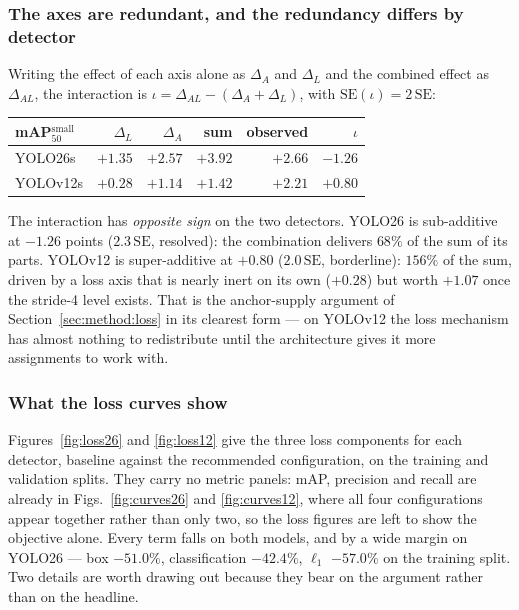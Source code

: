 \documentclass[10pt,twocolumn,a4paper]{article}
\begin{document}
\subsubsection*{The axes are redundant, and the redundancy differs by detector}

Writing the effect of each axis alone as $\Delta_A$ and $\Delta_L$ and the
combined effect as $\Delta_{AL}$, the interaction is
$\iota = \Delta_{AL} - (\Delta_A + \Delta_L)$, with
$\mathrm{SE}(\iota) = 2\,\mathrm{SE}$:

\begin{center}\small
\begin{tabular}{@{}lrrrrr@{}}
\toprule
mAP$_{50}^{\text{small}}$ & $\Delta_L$ & $\Delta_A$ & sum & observed & $\iota$ \\
\midrule
YOLO26s  & $+1.35$ & $+2.57$ & $+3.92$ & $+2.66$ & $\mathbf{-1.26}$ \\
YOLOv12s & $+0.28$ & $+1.14$ & $+1.42$ & $+2.21$ & $\mathbf{+0.80}$ \\
\bottomrule
\end{tabular}
\end{center}

\noindent The interaction has \emph{opposite sign} on the two detectors. YOLO26
is sub-additive at $-1.26$ points ($2.3\,\mathrm{SE}$, resolved): the
combination delivers $68\%$ of the sum of its parts. YOLOv12 is super-additive
at $+0.80$ ($2.0\,\mathrm{SE}$, borderline): $156\%$ of the sum, driven by a
loss axis that is nearly inert on its own ($+0.28$) but worth $+1.07$ once the
stride-4 level exists. That is the anchor-supply argument of
Section~\ref{sec:method:loss} in its clearest form --- on YOLOv12 the loss
mechanism has almost nothing to redistribute until the architecture gives it
more assignments to work with.



\subsubsection*{What the loss curves show}

Figures~\ref{fig:loss26} and \ref{fig:loss12} give the three loss components for
each detector, baseline against the recommended configuration, on the training
and validation splits. They carry no metric panels: mAP, precision and recall
are already in Figs.~\ref{fig:curves26} and \ref{fig:curves12}, where all four
configurations appear together rather than only two, so the loss figures are
left to show the objective alone. Every term falls on both models, and by a wide
margin on YOLO26 --- box $-51.0\%$, classification $-42.4\%$, $\ell_1$ $-57.0\%$
on the training split. Two details are worth drawing out because they bear on
the argument rather than on the headline.
\end{document}
